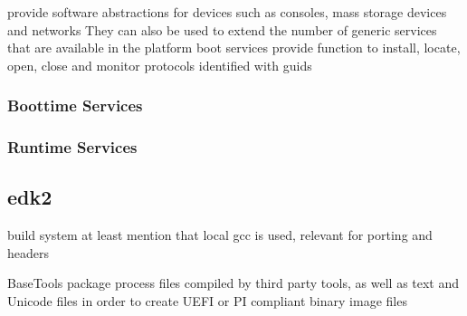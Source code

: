 provide software abstractions for devices such as consoles, mass storage devices and networks
They can also be used to extend the number of generic services that are available in the platform
\cite[2.4 Protocols]{uefi-spec}
boot services provide function to install, locate, open, close and monitor protocols
\cite[7.3 Protocol Handler Services]{uefi-spec}
identified with guids
\subsubsection{Boottime Services}
\subsubsection{Runtime Services}


\subsection{edk2}
build system
at least mention that local gcc is used, relevant for porting and headers

BaseTools package process files compiled by third party tools, as well as text and Unicode files in order to create UEFI or PI compliant binary image files
\cite{tianocore-edk2}